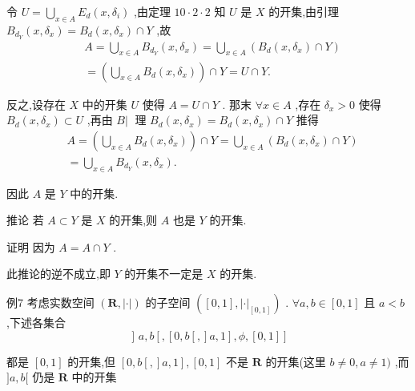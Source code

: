 令 $U = \mathop{\bigcup }\limits_{{x \in  A}}{E}_{d}\left( {x,{\delta }_{i}}\right)$ ,由定理 ${10} \cdot  2 \cdot  2$ 知 $U$ 是 $X$ 的开集,由引理 ${B}_{{d}_{Y}}\left( {x,{\delta }_{x}}\right)  = {B}_{d}\left( {x,{\delta }_{x}}\right)  \cap  Y$ ,故
\begin{align*}
	&A = \mathop{\bigcup }\limits_{{x \in  A}}{B}_{{d}_{Y}}\left( {x,{\delta }_{x}}\right)  = \mathop{\bigcup }\limits_{{x \in  A}}\left( {{B}_{d}\left( {x,{\delta }_{x}}\right)  \cap  Y}\right)\\
	&= \left( {\mathop{\bigcup }\limits_{{x \in  A}}{B}_{d}\left( {x,{\delta }_{x}}\right) }\right)  \cap  Y = U \cap  Y.
\end{align*}

反之,设存在 $X$ 中的开集 $U$ 使得 $A = U \cap  Y$ . 那末 $\forall x \in  A$ ,存在 ${\delta }_{x} > 0$ 使得 ${B}_{d}\left( {x,{\delta }_{x}}\right)  \subset  U$ ,再由 $\left. B\right| \;$ 理 ${B}_{d}\left( {x,{\delta }_{x}}\right)  = {B}_{d}\left( {x,{\delta }_{x}}\right)  \cap  Y$ 推得
\begin{align*}
	&A = \left( {\mathop{\bigcup }\limits_{{x \in  A}}{B}_{d}\left( {x,{\delta }_{x}}\right) }\right)  \cap  Y = \mathop{\bigcup }\limits_{{x \in  A}}\left( {{B}_{d}\left( {x,{\delta }_{x}}\right)  \cap  Y}\right)\\
	&= \mathop{\bigcup }\limits_{{x \in  A}}{B}_{{d}_{Y}}\left( {x,{\delta }_{x}}\right) .
\end{align*}

因此 $A$ 是 $Y$ 中的开集.

推论 若 $A \subset  Y$ 是 $X$ 的开集,则 $A$ 也是 $Y$ 的开集.

证明 因为 $A = A \cap  Y$ .

此推论的逆不成立,即 $Y$ 的开集不一定是 $X$ 的开集.

例7 考虑实数空间 $\left( {\mathbf{R},\left| \cdot \right| }\right)$ 的子空间 $\left( {\left\lbrack  {0,1}\right\rbrack  ,{\left| \cdot \right| }_{\left\lbrack  0,1\right\rbrack  }}\right)$ . $\forall a,b \in  \left\lbrack  {0,1}\right\rbrack$ 且 $a < b$ ,下述各集合
$$\text{ ] }a,b\left\lbrack  {,\left\lbrack  {0,b\left\lbrack  ,\right\rbrack  a,1}\right\rbrack  ,\phi ,\left\lbrack  {0,1}\right\rbrack  }\right\rbrack$$

都是 $\left\lbrack  {0,1}\right\rbrack$ 的开集,但 $\left\lbrack  {0,b\left\lbrack  ,\right\rbrack  a,1}\right\rbrack  ,\left\lbrack  {0,1}\right\rbrack$ 不是 $\mathbf{R}$ 的开集(这里 $b \neq  0,a \neq  1)$ ,而 $\rbrack a,b\lbrack$ 仍是 $\mathbf{R}$ 中的开集

